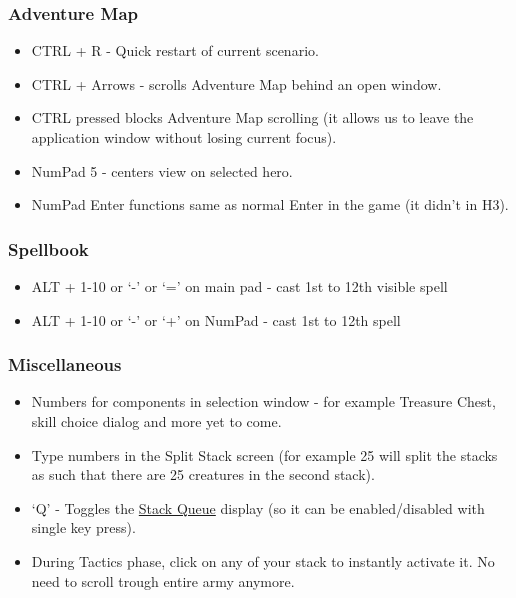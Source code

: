 \documentclass[a4size,final]{article}
\begin{document}
\subsubsection{Adventure Map} 
\begin{itemize}
\item CTRL + R - Quick restart of current scenario.
\item CTRL + Arrows - scrolls Adventure Map behind an open window.
\item CTRL pressed blocks Adventure Map scrolling (it allows us to leave the application window without losing current focus).
\item NumPad 5 - centers view on selected hero.
\item NumPad Enter functions same as normal Enter in the game (it didn't in H3).
\end{itemize}
\subsubsection{Spellbook}
\begin{itemize}
\item ALT + 1-10 or `-' or `=' on main pad - cast 1st to 12th visible spell
\item ALT + 1-10 or `-' or `+' on NumPad - cast 1st to 12th spell
\end{itemize}
\subsubsection{Miscellaneous}
\begin{itemize}
\item Numbers for components in selection window - for example Treasure Chest, skill choice dialog and more yet to come.
\item Type numbers in the Split Stack screen (for example 25 will split the stacks as such that there are 25 creatures in the second stack).
\item `Q' - Toggles the \hyperref[Stack_Queue]{Stack Queue} display (so it can be enabled/disabled with single key press).
\item During Tactics phase, click on any of your stack to instantly activate it. No need to scroll trough entire army anymore.
\end{itemize}
\end{document}
